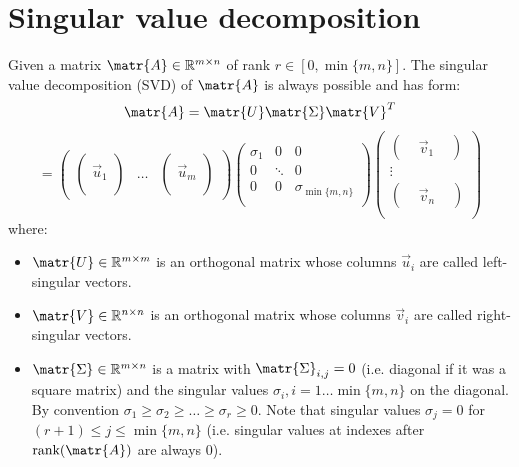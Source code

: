\section{Singular value decomposition}
Given a matrix $\matr{A} \in \mathbb{R}^{m \times n}$ of rank $r \in [0, \min\{m, n\}]$.
The singular value decomposition (SVD) of $\matr{A}$ is always possible and has form:
\[
    \matr{A} = \matr{U}\matr{\Sigma}\matr{V}^T
\]
\[
    =
    \begin{pmatrix}
        \begin{pmatrix} \\ \vec{u}_1 \\ \\ \end{pmatrix}    &
        \dots                                               &
        \begin{pmatrix} \\ \vec{u}_m \\ \\ \end{pmatrix} 
    \end{pmatrix}
    \begin{pmatrix}
        \sigma_1    & 0         & 0                 \\
        0           & \ddots    & 0                 \\
        0           & 0    & \sigma_{\min\{m, n\}}  \\
    \end{pmatrix}
    \begin{pmatrix}
        \begin{pmatrix} & \vec{v}_1 & \end{pmatrix} \\
        \vdots                                      \\
        \begin{pmatrix} & \vec{v}_n & \end{pmatrix} \\
    \end{pmatrix}
\]
where:
\begin{itemize}
    \item 
        $\matr{U} \in \mathbb{R}^{m \times m}$ is an orthogonal matrix whose columns $\vec{u}_i$ are called left-singular vectors.
    
    \item 
        $\matr{V} \in \mathbb{R}^{n \times n}$ is an orthogonal matrix whose columns $\vec{v}_i$ are called right-singular vectors.
    
    \item 
        $\matr{\Sigma} \in \mathbb{R}^{m \times n}$ is a matrix with $\matr{\Sigma}_{i,j} = 0$ (i.e. diagonal if it was a square matrix) and
        the singular values $\sigma_i, i = 1 \dots \min\{m, n\}$ on the diagonal.
        By convention $\sigma_1 \geq \sigma_2 \geq \dots \geq \sigma_r \geq 0$.
        Note that singular values $\sigma_j = 0$ for $(r + 1) \leq j \leq \min\{m, n\}$ 
        (i.e. singular values at indexes after $\text{rank}(\matr{A})$ are always 0).
\end{itemize}

